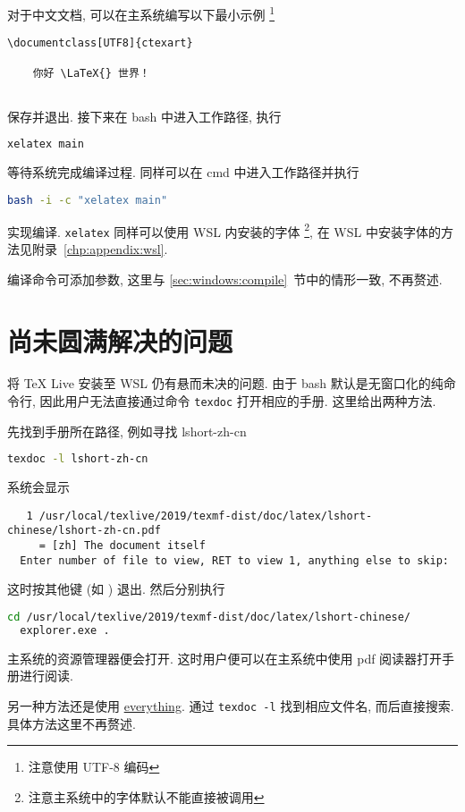 对于中文文档, 可以在主系统编写以下最小示例%
\footnote{注意使用 UTF-8 编码}%
\begin{lstlisting}[language={[LaTeX]TeX}]
  \documentclass[UTF8]{ctexart}
  
    你好 \LaTeX{} 世界！
  
\end{lstlisting}
保存并退出.
接下来在 \textsf{bash} 中进入工作路径,
执行
\begin{lstlisting}[language=bash]
  xelatex main
\end{lstlisting}
等待系统完成编译过程.
同样可以在 \textsf{cmd} 中进入工作路径并执行
\begin{lstlisting}[language=bash]
  bash -i -c "xelatex main"
\end{lstlisting}
实现编译.
\texttt{xelatex} 同样可以使用 WSL 内安装的字体%
\footnote{注意主系统中的字体默认不能直接被调用},
在 WSL 中安装字体的方法见附录~\ref{chp:appendix:wsl}.

编译命令可添加参数, 这里与 \ref{sec:windows:compile}~节中的情形一致, 不再赘述.

\section{尚未圆满解决的问题}

将 \TeX{} Live 安装至 WSL 仍有悬而未决的问题.
由于 \textsf{bash} 默认是无窗口化的纯命令行,
因此用户无法直接通过命令 \texttt{texdoc} 打开相应的手册.
这里给出两种方法.

先找到手册所在路径,
例如寻找 \textsf{lshort-zh-cn}
\begin{lstlisting}[language=bash]
  texdoc -l lshort-zh-cn
\end{lstlisting}
系统会显示
\begin{lstlisting}
   1 /usr/local/texlive/2019/texmf-dist/doc/latex/lshort-chinese/lshort-zh-cn.pdf
     = [zh] The document itself
  Enter number of file to view, RET to view 1, anything else to skip:
\end{lstlisting}
这时按其他键 (如 ) 退出.
然后分别执行
\begin{lstlisting}[language=bash]
  cd /usr/local/texlive/2019/texmf-dist/doc/latex/lshort-chinese/
  explorer.exe .
\end{lstlisting}
主系统的资源管理器便会打开.
这时用户便可以在主系统中使用 pdf 阅读器打开手册进行阅读.

另一种方法还是使用 \href{https://www.voidtools.com/zh-cn/}{everything}.
通过 \texttt{texdoc -l} 找到相应文件名,
而后直接搜索.
具体方法这里不再赘述.